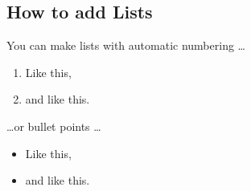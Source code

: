 \documentclass[a4paper]{article}
\begin{document}
\subsection{How to add Lists}

You can make lists with automatic numbering \dots

\begin{enumerate}
\item Like this,
\item and like this.
\end{enumerate}
\dots or bullet points \dots
\begin{itemize}
\item Like this,
\item and like this.
\end{itemize}
\end{document}
